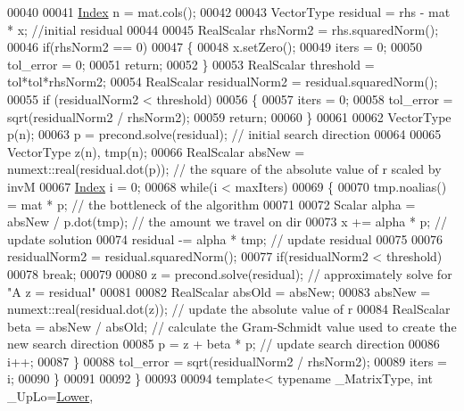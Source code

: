 \begin{DoxyCode}
00040   
00041   \hyperlink{namespace_eigen_a62e77e0933482dafde8fe197d9a2cfde}{Index} n = mat.cols();
00042 
00043   VectorType residual = rhs - mat * x; \textcolor{comment}{//initial residual}
00044 
00045   RealScalar rhsNorm2 = rhs.squaredNorm();
00046   \textcolor{keywordflow}{if}(rhsNorm2 == 0) 
00047   \{
00048     x.setZero();
00049     iters = 0;
00050     tol\_error = 0;
00051     \textcolor{keywordflow}{return};
00052   \}
00053   RealScalar threshold = tol*tol*rhsNorm2;
00054   RealScalar residualNorm2 = residual.squaredNorm();
00055   \textcolor{keywordflow}{if} (residualNorm2 < threshold)
00056   \{
00057     iters = 0;
00058     tol\_error = sqrt(residualNorm2 / rhsNorm2);
00059     \textcolor{keywordflow}{return};
00060   \}
00061   
00062   VectorType p(n);
00063   p = precond.solve(residual);      \textcolor{comment}{// initial search direction}
00064 
00065   VectorType z(n), tmp(n);
00066   RealScalar absNew = numext::real(residual.dot(p));  \textcolor{comment}{// the square of the absolute value of r scaled by
       invM}
00067   \hyperlink{namespace_eigen_a62e77e0933482dafde8fe197d9a2cfde}{Index} i = 0;
00068   \textcolor{keywordflow}{while}(i < maxIters)
00069   \{
00070     tmp.noalias() = mat * p;                    \textcolor{comment}{// the bottleneck of the algorithm}
00071 
00072     Scalar alpha = absNew / p.dot(tmp);         \textcolor{comment}{// the amount we travel on dir}
00073     x += alpha * p;                             \textcolor{comment}{// update solution}
00074     residual -= alpha * tmp;                    \textcolor{comment}{// update residual}
00075     
00076     residualNorm2 = residual.squaredNorm();
00077     \textcolor{keywordflow}{if}(residualNorm2 < threshold)
00078       \textcolor{keywordflow}{break};
00079     
00080     z = precond.solve(residual);                \textcolor{comment}{// approximately solve for "A z = residual"}
00081 
00082     RealScalar absOld = absNew;
00083     absNew = numext::real(residual.dot(z));     \textcolor{comment}{// update the absolute value of r}
00084     RealScalar beta = absNew / absOld;          \textcolor{comment}{// calculate the Gram-Schmidt value used to create the new
       search direction}
00085     p = z + beta * p;                           \textcolor{comment}{// update search direction}
00086     i++;
00087   \}
00088   tol\_error = sqrt(residualNorm2 / rhsNorm2);
00089   iters = i;
00090 \}
00091 
00092 \}
00093 
00094 \textcolor{keyword}{template}< \textcolor{keyword}{typename} \_MatrixType, \textcolor{keywordtype}{int} \_UpLo=\hyperlink{group__enums_gga39e3366ff5554d731e7dc8bb642f83cda891792b8ed394f7607ab16dd716f60e6}{Lower},

\end{DoxyCode}
